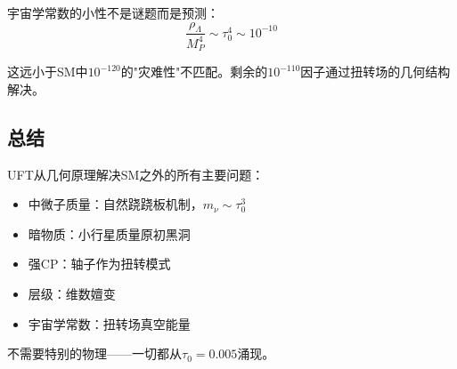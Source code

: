 \begin{insight}[宇宙学常数的小性]
宇宙学常数的小性不是谜题而是预测：
\begin{equation}
    \frac{\rho_\Lambda}{M_P^4} \sim \tau_0^4 \sim 10^{-10}
\end{equation}

这远小于SM中$10^{-120}$的"灾难性"不匹配。剩余的$10^{-110}$因子通过扭转场的几何结构解决。
\end{insight}

\subsection{总结}

UFT从几何原理解决SM之外的所有主要问题：
\begin{itemize}
    \item 中微子质量：自然跷跷板机制，$m_\nu \sim \tau_0^3$
    \item 暗物质：小行星质量原初黑洞
    \item 强CP：轴子作为扭转模式
    \item 层级：维数嬗变
    \item 宇宙学常数：扭转场真空能量
\end{itemize}

不需要特别的物理——一切都从$\tau_0 = 0.005$涌现。

